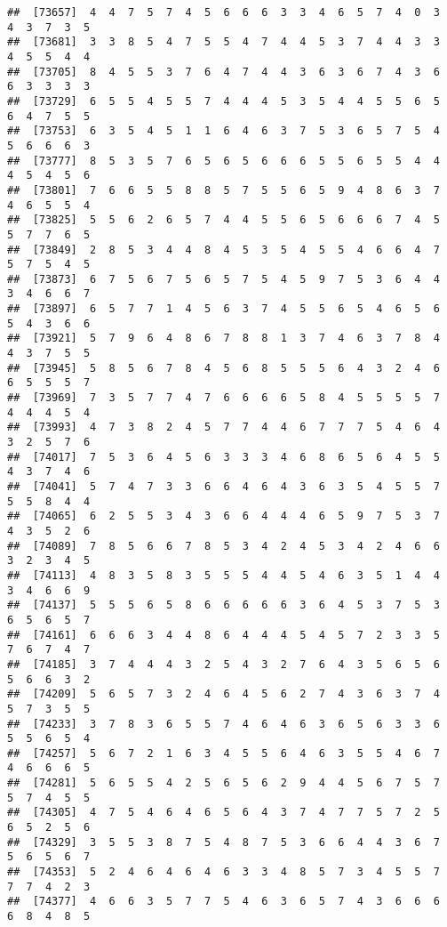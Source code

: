 \documentclass[
]{book}
\begin{document}
\begin{verbatim}
##  [73657]  4  4  7  5  7  4  5  6  6  6  3  3  4  6  5  7  4  0  3  4  3  7  3  5
##  [73681]  3  3  8  5  4  7  5  5  4  7  4  4  5  3  7  4  4  3  3  4  5  5  4  4
##  [73705]  8  4  5  5  3  7  6  4  7  4  4  3  6  3  6  7  4  3  6  6  3  3  3  3
##  [73729]  6  5  5  4  5  5  7  4  4  4  5  3  5  4  4  5  5  6  5  6  4  7  5  5
##  [73753]  6  3  5  4  5  1  1  6  4  6  3  7  5  3  6  5  7  5  4  5  6  6  6  3
##  [73777]  8  5  3  5  7  6  5  6  5  6  6  6  5  5  6  5  5  4  4  4  5  4  5  6
##  [73801]  7  6  6  5  5  8  8  5  7  5  5  6  5  9  4  8  6  3  7  4  6  5  5  4
##  [73825]  5  5  6  2  6  5  7  4  4  5  5  6  5  6  6  6  7  4  5  5  7  7  6  5
##  [73849]  2  8  5  3  4  4  8  4  5  3  5  4  5  5  4  6  6  4  7  5  7  5  4  5
##  [73873]  6  7  5  6  7  5  6  5  7  5  4  5  9  7  5  3  6  4  4  3  4  6  6  7
##  [73897]  6  5  7  7  1  4  5  6  3  7  4  5  5  6  5  4  6  5  6  5  4  3  6  6
##  [73921]  5  7  9  6  4  8  6  7  8  8  1  3  7  4  6  3  7  8  4  4  3  7  5  5
##  [73945]  5  8  5  6  7  8  4  5  6  8  5  5  5  6  4  3  2  4  6  6  5  5  5  7
##  [73969]  7  3  5  7  7  4  7  6  6  6  6  5  8  4  5  5  5  5  7  4  4  4  5  4
##  [73993]  4  7  3  8  2  4  5  7  7  4  4  6  7  7  7  5  4  6  4  3  2  5  7  6
##  [74017]  7  5  3  6  4  5  6  3  3  3  4  6  8  6  5  6  4  5  5  4  3  7  4  6
##  [74041]  5  7  4  7  3  3  6  6  4  6  4  3  6  3  5  4  5  5  7  5  5  8  4  4
##  [74065]  6  2  5  5  3  4  3  6  6  4  4  4  6  5  9  7  5  3  7  4  3  5  2  6
##  [74089]  7  8  5  6  6  7  8  5  3  4  2  4  5  3  4  2  4  6  6  3  2  3  4  5
##  [74113]  4  8  3  5  8  3  5  5  5  4  4  5  4  6  3  5  1  4  4  3  4  6  6  9
##  [74137]  5  5  5  6  5  8  6  6  6  6  6  3  6  4  5  3  7  5  3  6  5  6  5  7
##  [74161]  6  6  6  3  4  4  8  6  4  4  4  5  4  5  7  2  3  3  5  7  6  7  4  7
##  [74185]  3  7  4  4  4  3  2  5  4  3  2  7  6  4  3  5  6  5  6  5  6  6  3  2
##  [74209]  5  6  5  7  3  2  4  6  4  5  6  2  7  4  3  6  3  7  4  5  7  3  5  5
##  [74233]  3  7  8  3  6  5  5  7  4  6  4  6  3  6  5  6  3  3  6  5  5  6  5  4
##  [74257]  5  6  7  2  1  6  3  4  5  5  6  4  6  3  5  5  4  6  7  4  6  6  6  5
##  [74281]  5  6  5  5  4  2  5  6  5  6  2  9  4  4  5  6  7  5  7  5  7  4  5  5
##  [74305]  4  7  5  4  6  4  6  5  6  4  3  7  4  7  7  5  7  2  5  6  5  2  5  6
##  [74329]  3  5  5  3  8  7  5  4  8  7  5  3  6  6  4  4  3  6  7  5  6  5  6  7
##  [74353]  5  2  4  6  4  6  4  6  3  3  4  8  5  7  3  4  5  5  7  7  7  4  2  3
##  [74377]  4  6  6  3  5  7  7  5  4  6  3  6  5  7  4  3  6  6  6  6  8  4  8  5

\end{verbatim}
\end{document}
